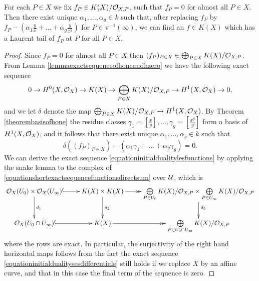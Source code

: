     \begin{cor}\label{cormittagleffler}
    For each $P \in X$ we fix $f_P \in K(X)/{\cal O}_{X,P}$, such that $f_P = 0$ for almost all $P \in X$.
    Then there exist unique $\alpha_1, \ldots, \alpha_g \in k$ such that, after replacing $f_P$ by $f_P - \left( \alpha_1 \frac{y}{x} + \ldots + \alpha_g \frac{y}{x^g}\right)$ for $P \in \pi^{-1}(\infty)$, we can find an $f \in K(X)$ which has a Laurent tail of $f_P$ at $P$ for all $P \in X$.
    \end{cor}
    \begin{proof}
    Since $f_P = 0$ for almost all $P \in X$ then $(f_P)_{P \in X} \in \bigoplus_{P \in X} K(X)/{\cal O}_{X,P}$.
    From Lemma \ref{lemmaexactsequenceofhoneandhzero} we have the following exact sequence
        \begin{equation*}
        0 \rightarrow H^0(X,{\cal O}_X) \rightarrow K(X) \rightarrow \bigoplus_{P \in X} K(X)/{\cal O}_{X,P} \rightarrow H^1(X,\mathcal{O}_X) \rightarrow 0,
        \end{equation*}
    and we let $\delta$ denote the map $\bigoplus_{P \in X} K(X)/{\cal O}_{X,P} \rightarrow H^1(X,\mathcal{O}_X)$.
    By Theorem \ref{theorembasisofhone} the residue classes $ \gamma_ 1= \left[ \frac{x}{y}\right], \ldots, \gamma_g = \left[\frac{x^g}{y}\right]$ form a basis of $H^1(X,\mathcal{O}_X)$, and it follows that there exist unique $\alpha_1, \ldots, \alpha_g \in k$ such that
        \[
        \delta\left( (f_P)_{P \in X} \right) - \left( \alpha_1\gamma_1 + \ldots + \alpha_g\gamma_g \right) = 0.
        \]
    We can derive the exact sequence \eqref{equationinitialdualitylesfunctions} by applying the snake lemma to the \cech complex of \eqref{equationshortexactsequencefunctionsdirectsum} over ${\mathcal U}$, which is
        \begin{equation*}
        \xymatrix{\cO_X(U_0)\times\cO_X(U_\infty) \ar@{^{(}->}[r] \ar[d]^{d_1} & K(X) \times K(X) \ar[d]^{d_2} \ar@{->>}[r] & \bigoplus \limits_{P \in U_0} K(X)/\cO_{X,P} \times \bigoplus \limits_{P \in U_\infty} K(X)/\cO_{X,P} \ar[d]^{d_3} \\
        \cO_X(U_0 \cap U_\infty) \ar@{^{(}->}[r]  & K(X) \ar@{->>}[r] & \bigoplus \limits_{P\in U_0 \cap U_\infty} K(X)/\cO_{X,P} }
        \end{equation*}
        where the rows are exact.
        In particular, the surjectivity of the right hand horizontal maps follows from the fact the exact sequence \eqref{equationinitialdualitysesdifferentials} still holds if we replace $X$ by an affine curve, and that in this case the final term of the sequence is zero.

\end{proof}
